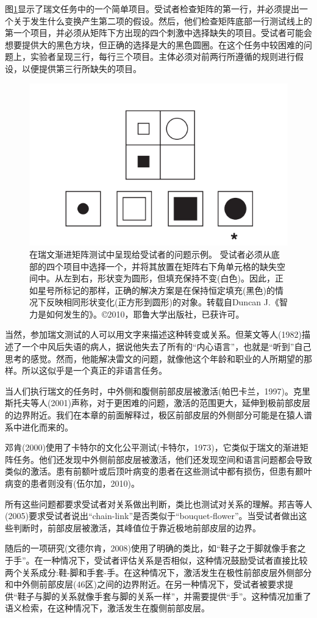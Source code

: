 图\ref{fig:fig_9_8}显示了瑞文任务中的一个简单项目。受试者检查矩阵的第一行，并必须提出一个关于发生什么变换产生第二项的假设。然后，他们检查矩阵底部一行测试线上的第一个项目，并必须从矩阵下方出现的四个刺激中选择缺失的项目。受试者可能会想要提供大的黑色方块，但正确的选择是大的黑色圆圈。在这个任务中较困难的问题上，实验者呈现三行，每行三个项目。主体必须对前两行所遵循的规则进行假设，以便提供第三行所缺失的项目。
\begin{figure}[!htb]
	\centering
	\includegraphics[width=0.5\linewidth]{image_pfc/Fig_9_8}
	\caption{在瑞文渐进矩阵测试中呈现给受试者的问题示例。
受试者必须从底部的四个项目中选择一个，并将其放置在矩阵右下角单元格的缺失空间中。从左到右，形状变为圆形，但填充保持不变(白色)。因此，正如星号所标记的那样，正确的解决方案是在保持恒定填充(黑色)的情况下反映相同形状变化(正方形到圆形)的对象。转载自Duncan J.《智力是如何发生的》。©2010，耶鲁大学出版社，已获许可。\label{fig:fig_9_8}}
\end{figure}


当然，参加瑞文测试的人可以用文字来描述这种转变或关系。但莱文等人(1982)描述了一个中风后失语的病人，据说他失去了所有的“内心语言”，也就是“听到”自己思考的感觉。然而，他能解决雷文的问题，就像他这个年龄和职业的人所期望的那样。所以这似乎是一个真正的非语言任务。

当人们执行瑞文的任务时，中外侧和腹侧前部皮层被激活(帕巴卡兰，1997)。克里斯托夫等人(2001)声称，对于更困难的问题，激活的范围更大，延伸到极前部皮层的边界附近。我们在本章的前面解释过，极区前部皮层的外侧部分可能是在猿人谱系中进化而来的。

邓肯(2000)使用了卡特尔的文化公平测试(卡特尔，1973)，它类似于瑞文的渐进矩阵任务。他们还发现中外侧前部皮层被激活，他们还发现空间和语言问题都会导致类似的激活。患有前额叶或后顶叶病变的患者在这些测试中都有损伤，但患有颞叶病变的患者则没有(伍尔加，2010)。

所有这些问题都要求受试者对关系做出判断，类比也测试对关系的理解。邦吉等人(2005)要求受试者说出“chain-link”是否类似于“bouquet-flower”。当受试者做出这些判断时，前部皮层被激活，其峰值位于靠近极地前部皮层的边界。

随后的一项研究(文德尔肯，2008)使用了明确的类比，如“鞋子之于脚就像手套之于手”。在一种情况下，受试者评估关系是否相似，这种情况鼓励受试者直接比较两个关系成分:鞋-脚和手套-手。在这种情况下，激活发生在极性前部皮层外侧部分和中外侧前部皮层(46区)之间的边界附近。在另一种情况下，受试者被要求提供“鞋子与脚的关系就像手套与脚的关系一样”，并需要提供“手”。这种情况加重了语义检索，在这种情况下，激活发生在腹侧前部皮层。

